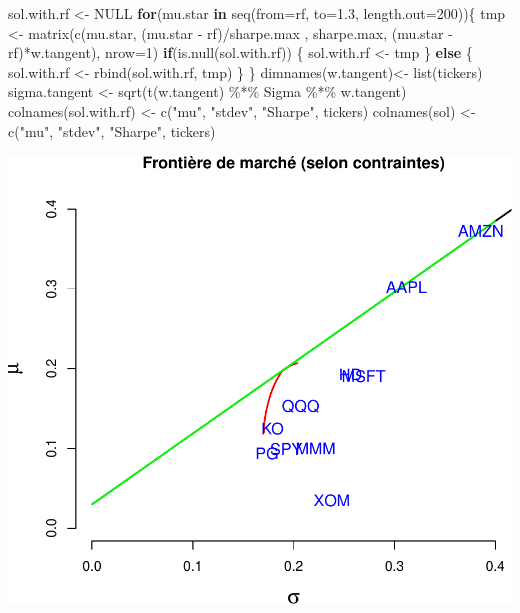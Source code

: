 \documentclass[
]{article}
\newenvironment{Shaded}{\begin{snugshade}}{\end{snugshade}}
\newcommand{\AttributeTok}[1]{\textcolor[rgb]{0.77,0.63,0.00}{#1}}
\newcommand{\ConstantTok}[1]{\textcolor[rgb]{0.00,0.00,0.00}{#1}}
\newcommand{\ControlFlowTok}[1]{\textcolor[rgb]{0.13,0.29,0.53}{\textbf{#1}}}
\newcommand{\DecValTok}[1]{\textcolor[rgb]{0.00,0.00,0.81}{#1}}
\newcommand{\FloatTok}[1]{\textcolor[rgb]{0.00,0.00,0.81}{#1}}
\newcommand{\FunctionTok}[1]{\textcolor[rgb]{0.00,0.00,0.00}{#1}}
\newcommand{\NormalTok}[1]{#1}
\newcommand{\OtherTok}[1]{\textcolor[rgb]{0.56,0.35,0.01}{#1}}
\newcommand{\SpecialCharTok}[1]{\textcolor[rgb]{0.00,0.00,0.00}{#1}}
\newcommand{\StringTok}[1]{\textcolor[rgb]{0.31,0.60,0.02}{#1}}
\begin{document}
\begin{Shaded}
\begin{Highlighting}[]
\NormalTok{sol.with.rf }\OtherTok{\textless{}{-}} \ConstantTok{NULL}
\ControlFlowTok{for}\NormalTok{(mu.star }\ControlFlowTok{in} \FunctionTok{seq}\NormalTok{(}\AttributeTok{from=}\NormalTok{rf, }\AttributeTok{to=}\FloatTok{1.3}\NormalTok{, }\AttributeTok{length.out=}\DecValTok{200}\NormalTok{))\{}
\NormalTok{  tmp }\OtherTok{\textless{}{-}} \FunctionTok{matrix}\NormalTok{(}\FunctionTok{c}\NormalTok{(mu.star, (mu.star }\SpecialCharTok{{-}}\NormalTok{ rf)}\SpecialCharTok{/}\NormalTok{sharpe.max , sharpe.max, (mu.star }\SpecialCharTok{{-}}\NormalTok{ rf)}\SpecialCharTok{*}\NormalTok{w.tangent), }\AttributeTok{nrow=}\DecValTok{1}\NormalTok{)}
  \ControlFlowTok{if}\NormalTok{(}\FunctionTok{is.null}\NormalTok{(sol.with.rf)) \{}
\NormalTok{    sol.with.rf }\OtherTok{\textless{}{-}}\NormalTok{ tmp  }
\NormalTok{  \} }\ControlFlowTok{else}\NormalTok{ \{}
\NormalTok{    sol.with.rf }\OtherTok{\textless{}{-}} \FunctionTok{rbind}\NormalTok{(sol.with.rf, tmp)}
\NormalTok{  \}}
\NormalTok{\}}
\FunctionTok{dimnames}\NormalTok{(w.tangent)}\OtherTok{\textless{}{-}} \FunctionTok{list}\NormalTok{(tickers)}
\NormalTok{sigma.tangent }\OtherTok{\textless{}{-}} \FunctionTok{sqrt}\NormalTok{(}\FunctionTok{t}\NormalTok{(w.tangent) }\SpecialCharTok{\%*\%}\NormalTok{ Sigma }\SpecialCharTok{\%*\%}\NormalTok{ w.tangent)}
\FunctionTok{colnames}\NormalTok{(sol.with.rf) }\OtherTok{\textless{}{-}} \FunctionTok{c}\NormalTok{(}\StringTok{"mu"}\NormalTok{, }\StringTok{"stdev"}\NormalTok{, }\StringTok{"Sharpe"}\NormalTok{, tickers)}
\FunctionTok{colnames}\NormalTok{(sol) }\OtherTok{\textless{}{-}} \FunctionTok{c}\NormalTok{(}\StringTok{"mu"}\NormalTok{, }\StringTok{"stdev"}\NormalTok{, }\StringTok{"Sharpe"}\NormalTok{, tickers)}
\end{Highlighting}
\end{Shaded}

\includegraphics{TP-2_files/figure-latex/unnamed-chunk-20-1.pdf}
\end{document}
